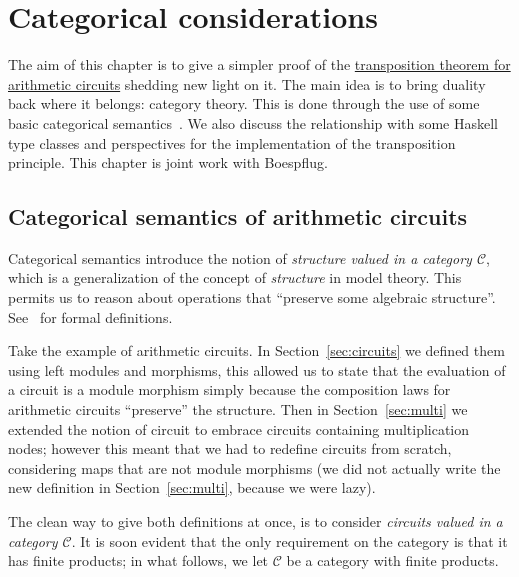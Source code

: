 \chapter{Categorical considerations}
\label{cha:basic-categ-theory}

\renewcommand{\C}{\mathcal{C}}
\newcommand{\D}{\mathcal{D}}

The aim of this chapter is to give a simpler proof of the
\hyperref[th:tellegen]{transposition theorem for arithmetic circuits}
shedding new light on it. The main idea is to bring duality back where
it belongs: category theory. This is done through the use of some
basic categorical semantics~\cite{pitts01,asperti+longo}. We also
discuss the relationship with some Haskell type classes and
perspectives for the implementation of the transposition
principle. This chapter is joint work with Boespflug.



\section{Categorical semantics of arithmetic circuits}
\label{sec:categ-semant-arithm}
Categorical semantics introduce the
notion of \emph{structure valued
  in a category $\C$}, which is a generalization of the concept of
\emph{structure} in model theory. This permits us to
reason about operations that ``preserve some algebraic structure''.
See~\cite{pitts01} for formal definitions.

Take the example of arithmetic circuits. In
Section~\ref{sec:circuits} we defined them using left modules and
morphisms, this allowed us to state that the evaluation of a circuit
is a module morphism simply because the composition laws for
arithmetic circuits ``preserve'' the structure. Then in
Section~\ref{sec:multi} we extended the notion of circuit to embrace
circuits containing multiplication nodes; however this meant that we
had to redefine circuits from scratch, considering maps that are not
module morphisms (we did not actually write the new definition in
Section~\ref{sec:multi}, because we were lazy).

The clean way to give both definitions at once, is to consider
\emph{circuits valued
  in a category $\C$}.  It is soon evident that the only requirement
on the category is that it has finite products; in what follows, we
let $\C$ be a category with finite products.
  
